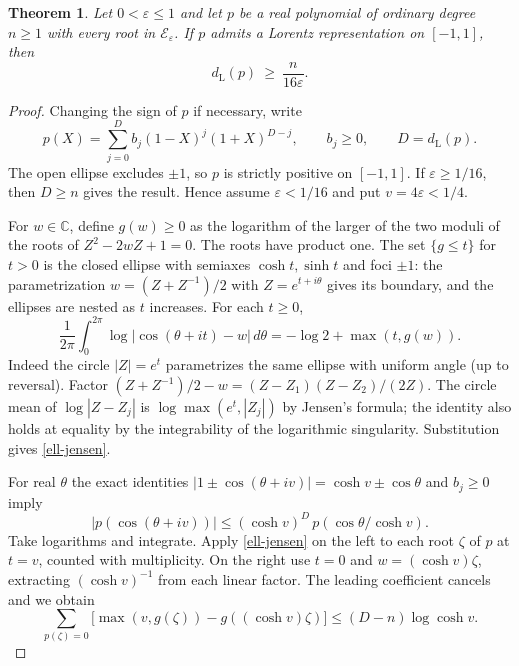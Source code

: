 \documentclass[11pt]{article}
\newtheorem{theorem}{Theorem}
\newcommand{\dd}{d_{\mathrm L}}
\begin{document}
\begin{theorem}\label{universal}
Let $0<\varepsilon\le 1$ and let $p$ be a real polynomial of ordinary degree $n\ge 1$ with every root in $\mathcal E_\varepsilon$. If $p$ admits a Lorentz representation on $[-1,1]$, then
\[
                  \dd(p)\ \ge\ \frac{n}{16\varepsilon}.
\]
\end{theorem}
\begin{proof}
Changing the sign of $p$ if necessary, write
\[
 p(X)=\sum_{j=0}^D b_j(1-X)^j(1+X)^{D-j},\qquad b_j\ge 0,\qquad D=\dd(p).
\]
The open ellipse excludes $\pm1$, so $p$ is strictly positive on $[-1,1]$. If $\varepsilon\ge1/16$, then $D\ge n$ gives the result. Hence assume $\varepsilon<1/16$ and put $v=4\varepsilon<1/4$.

For $w\in\mathbb C$, define $g(w)\ge0$ as the logarithm of the larger of the two moduli of the roots of $Z^2-2wZ+1=0$. The roots have product one. The set $\{g\le t\}$ for $t>0$ is the closed ellipse with semiaxes $\cosh t,\sinh t$ and foci $\pm1$: the parametrization $w=(Z+Z^{-1})/2$ with $Z=e^{t+i\theta}$ gives its boundary, and the ellipses are nested as $t$ increases. For each $t\ge0$,
\begin{equation}\label{ell-jensen}
 \frac1{2\pi}\int_0^{2\pi}\log|\cos(\theta+it)-w|\,d\theta
       =-\log 2+\max(t,g(w)).
\end{equation}
Indeed the circle $|Z|=e^t$ parametrizes the same ellipse with uniform angle (up to reversal). Factor $(Z+Z^{-1})/2-w=(Z-Z_1)(Z-Z_2)/(2Z)$. The circle mean of $\log|Z-Z_j|$ is $\log\max(e^t,|Z_j|)$ by Jensen's formula; the identity also holds at equality by the integrability of the logarithmic singularity. Substitution gives \eqref{ell-jensen}.

For real $\theta$ the exact identities $|1\pm\cos(\theta+iv)|=\cosh v\pm\cos\theta$ and $b_j\ge0$ imply
\[
 |p(\cos(\theta+iv))|\le (\cosh v)^D\,p(\cos\theta/\cosh v).
\]
Take logarithms and integrate. Apply \eqref{ell-jensen} on the left to each root $\zeta$ of $p$ at $t=v$, counted with multiplicity. On the right use $t=0$ and $w=(\cosh v)\zeta$, extracting $(\cosh v)^{-1}$ from each linear factor. The leading coefficient cancels and we obtain
\begin{equation}\label{ell-budget}
 \sum_{p(\zeta)=0}\bigl[\max(v,g(\zeta))-g((\cosh v)\zeta)\bigr]
          \le (D-n)\log\cosh v.
\end{equation}


\end{proof}
\end{document}
